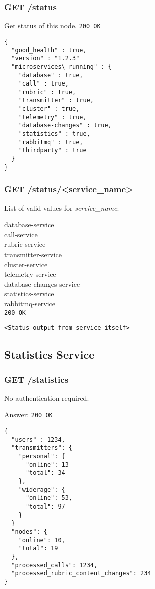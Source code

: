 \subsubsection{GET /status}
Get status of this node.
\texttt{200 OK}
\begin{lstlisting}
{
  "good_health" : true,
  "version" : "1.2.3"
  "microservices\_running" : {
    "database" : true,
    "call" : true,
    "rubric" : true,
    "transmitter" : true,
    "cluster" : true,
    "telemetry" : true,
    "database-changes" : true,
    "statistics" : true,
    "rabbitmq" : true,
    "thirdparty" : true
  }
}
\end{lstlisting}

\subsubsection{GET /status/<service\_name>}
List of valid values for \textit{service\_name}:

database-service\\
call-service\\
rubric-service\\
transmitter-service\\
cluster-service\\
telemetry-service\\
database-changes-service\\
statistics-service\\
rabbitmq-service\\


\texttt{200 OK}
\begin{lstlisting}
<Status output from service itself>
\end{lstlisting}


\subsection{Statistics Service}

\subsubsection{GET /statistics}
No authentication required.

Answer:
\texttt{200 OK}
\begin{lstlisting}
{
  "users" : 1234,
  "transmitters": {
    "personal": {
      "online": 13
      "total": 34
    },
    "widerage": {
      "online": 53,
      "total": 97
    }
  }
  "nodes": {
    "online": 10,
    "total": 19
  },
  "processed_calls": 1234,
  "processed_rubric_content_changes": 234
}
\end{lstlisting}

